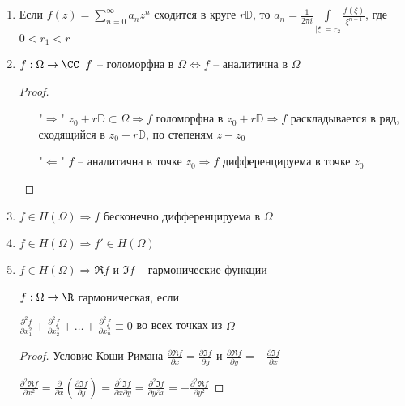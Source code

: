 \begin{consequence}\thmslashn
	
	\begin{enumerate}
		\item 
		Если $f(z) = \sum\limits_{n = 0}^{\infty} a_n z^n$ сходится в круге $r \mathbb{D}$, то 
		$a_n = \frac{1}{2\pi i}\int\limits_{|\xi| = r_2} \frac{f(\xi)}{\xi^{n+1}}$, где $0 < r_1 < r$
		
		\item
		$f:\Omega \to \CC \;\; f$ -- голоморфна в $\Omega \Leftrightarrow f$ -- аналитична в $\Omega$
		
		\begin{proof}\thmslashn
			
			\begin{enumerate}
				\item ["$\Rightarrow$"]
				$z_0+r\mathbb{D}\subset \Omega \Rightarrow f$ голоморфна в $z_0+r\mathbb{D} \Rightarrow f$ раскладывается в ряд, сходящийся в $z_0+r\mathbb{D}$, по степеням $z - z_0$
				
				\item ["$\Leftarrow$"]
				$f$ -- аналитична в точке $z_0 \Rightarrow f$ дифференцируема в точке $z_0$
			\end{enumerate}
		\end{proof} 
		
		\item
		$f\in H(\Omega) \Rightarrow f$ бесконечно дифференцируема в $\Omega$
		
		\item
		$f \in H(\Omega) \Rightarrow f' \in H(\Omega)$
		
		\item
		$f \in H(\Omega) \Rightarrow \Re f$ и $\Im f$ -- гармонические функции
		
		\begin{remark}\thmslashn
			
			$f:\Omega \to \R$ гармоническая, если 
			
			$\frac{\partial^2 f}{\partial x_1^2} + \frac{\partial^2 f}{\partial x_2^2} + \ldots + \frac{\partial^2 f}{\partial x_n^2} \equiv 0$ во всех точках из $\Omega$
		\end{remark}
		
		\begin{proof}\thmslashn
			
			Условие Коши-Римана $\frac{\partial \Re f}{\partial x} = \frac{\partial \Im f}{\partial y}$ и $\frac{\partial \Re f}{\partial y} = -\frac{\partial \Im f}{\partial x}$
			
			$\frac{\partial^2 \Re f}{\partial x^2} = \frac{\partial}{\partial x} \left(\frac{\partial \Im f}{\partial y} \right) = \frac{\partial^2 \Im f}{\partial x \partial y} = \frac{\partial^2 \Im f}{\partial y \partial x} = -\frac{\partial^2 \Re f}{\partial y^2}$
			
		\end{proof}
	
	\end{enumerate}
	
\end{consequence}

